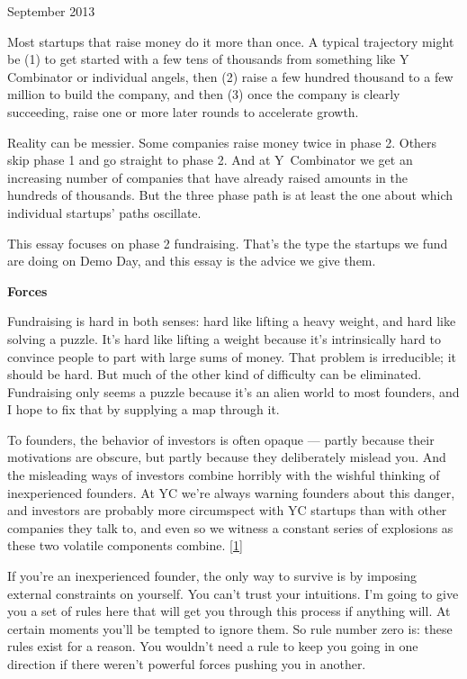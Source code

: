 September 2013

Most startups that raise money do it more than once. A typical
trajectory might be (1) to get started with a few tens of thousands from
something like Y Combinator or individual angels, then (2) raise a few
hundred thousand to a few million to build the company, and then (3)
once the company is clearly succeeding, raise one or more later rounds
to accelerate growth.

Reality can be messier. Some companies raise money twice in phase 2.
Others skip phase 1 and go straight to phase 2. And at Y~Combinator we
get an increasing number of companies that have already raised amounts
in the hundreds of thousands. But the three phase path is at least the
one about which individual startups' paths oscillate.

This essay focuses on phase 2 fundraising. That's the type the startups
we fund are doing on Demo Day, and this essay is the advice we give
them.

\textbf{Forces}

Fundraising is hard in both senses: hard like lifting a heavy weight,
and hard like solving a puzzle. It's hard like lifting a weight because
it's intrinsically hard to convince people to part with large sums of
money. That problem is irreducible; it should be hard. But much of the
other kind of difficulty can be eliminated. Fundraising only seems a
puzzle because it's an alien world to most founders, and I hope to fix
that by supplying a map through it.

To founders, the behavior of investors is often opaque --- partly
because their motivations are obscure, but partly because they
deliberately mislead you. And the misleading ways of investors combine
horribly with the wishful thinking of inexperienced founders. At YC
we're always warning founders about this danger, and investors are
probably more circumspect with YC startups than with other companies
they talk to, and even so we witness a constant series of explosions as
these two volatile components combine. {[}\hyperref[f1n]{1}{]}

If you're an inexperienced founder, the only way to survive is by
imposing external constraints on yourself. You can't trust your
intuitions. I'm going to give you a set of rules here that will get you
through this process if anything will. At certain moments you'll be
tempted to ignore them. So rule number zero is: these rules exist for a
reason. You wouldn't need a rule to keep you going in one direction if
there weren't powerful forces pushing you in another.


